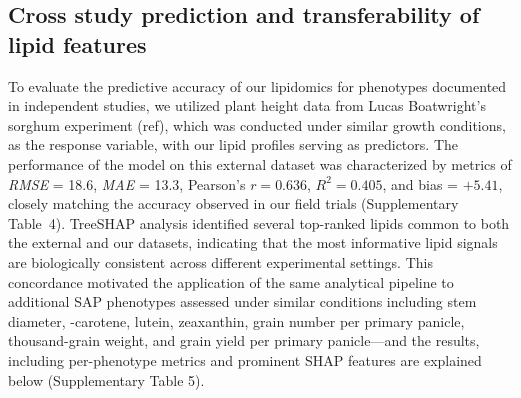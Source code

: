 \documentclass[10pt,letterpaper]{article}
\begin{document}
\subsection*{Cross study prediction and transferability of lipid features}
To evaluate the predictive accuracy of our lipidomics for phenotypes documented in independent studies, we utilized plant height data from Lucas Boatwright’s sorghum experiment (ref), which was conducted under similar growth conditions, as the response variable, with our lipid profiles serving as predictors. The performance of the model on this external dataset was characterized by metrics of \emph{RMSE} = 18.6, \emph{MAE} = 13.3, Pearson’s $r = 0.636$, $R^2 = 0.405$, and bias = $+5.41$, closely matching the accuracy observed in our field trials (Supplementary Table~4). TreeSHAP analysis identified several top-ranked lipids common to both the external and our datasets, indicating that the most informative lipid signals are biologically consistent across different experimental settings. This concordance motivated the application of the same analytical pipeline to additional SAP phenotypes assessed under similar conditions including stem diameter, \textbeta-carotene, lutein, zeaxanthin, grain number per primary panicle, thousand-grain weight, and grain yield per primary panicle—and the results, including per-phenotype metrics and prominent SHAP features are explained below (Supplementary Table 5).





\end{document}
